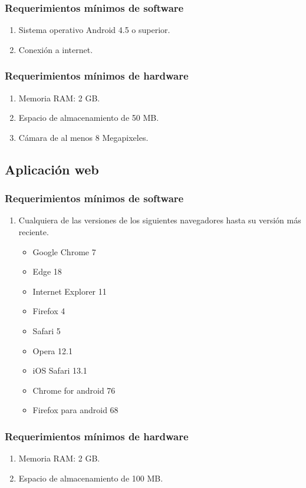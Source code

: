     \subsubsection{Requerimientos mínimos de software}
    \begin{enumerate}
        \item Sistema operativo Android 4.5 o superior.
        \item Conexión a internet.
    \end{enumerate}
    
    \subsubsection{Requerimientos mínimos de hardware}
    \begin{enumerate}
        \item Memoria RAM: 2 GB.
        \item Espacio de almacenamiento de 50 MB.
        \item Cámara de al menos 8 Megapixeles.
    \end{enumerate}
    \subsection{Aplicación web}
    \subsubsection{Requerimientos mínimos de software}
    \begin{enumerate}
        \item Cualquiera de las versiones de los siguientes navegadores hasta su versión más reciente.
        \begin{itemize}
            \item Google Chrome 7
            \item Edge 18
            \item Internet Explorer 11
            \item Firefox 4
            \item Safari 5
            \item Opera 12.1
            \item iOS Safari 13.1
            \item Chrome for android 76
            \item Firefox para android 68
        \end{itemize}
    \end{enumerate}
    \subsubsection{Requerimientos mínimos de hardware}
    \begin{enumerate}
        \item Memoria RAM: 2 GB.
        \item Espacio de almacenamiento de 100 MB.
    \end{enumerate}
